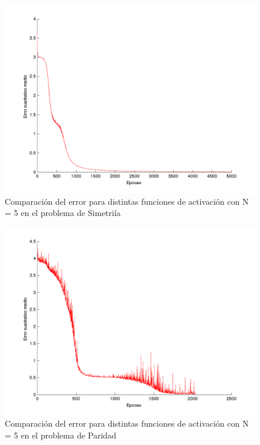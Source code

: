\documentclass{sig-alternate}
\begin{document}
\newpage

\begin{figure}[!ht]
	\includegraphics[scale=0.5]{images/sym_tanh_N5_eta002.png}
  \caption{Comparaci\'on del error para distintas funciones de activaci\'on con N = 5 en el problema de Simetri\'ia}
  \label{fig:symN5_TANH}
\end{figure}

\begin{figure}[!ht]
	\includegraphics[scale=0.5]{images/par_tanh_N5_eta009.png}
  \caption{Comparaci\'on del error para distintas funciones de activaci\'on con N = 5 en el problema de Paridad}
  \label{fig:parN5_TANH}
\end{figure}
\end{document}
